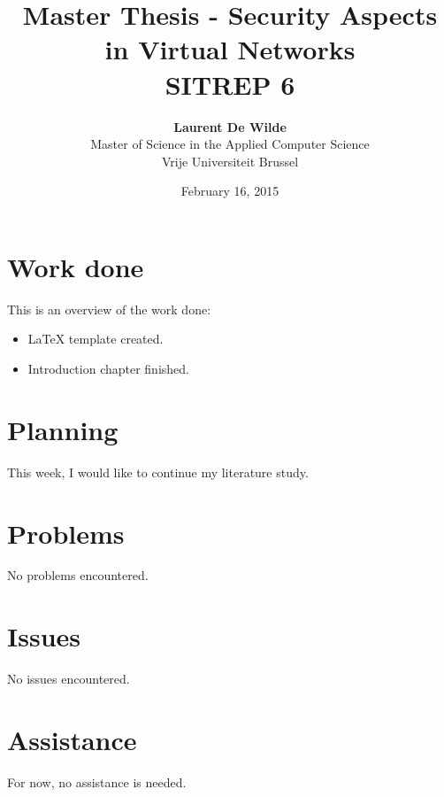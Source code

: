 \documentclass[11pt, a4paper]{article}
\title{Master Thesis -  Security Aspects in Virtual Networks\\ \textbf{SITREP 6}}
\author{\textbf{Laurent De Wilde} \\ Master of Science in the Applied Computer Science \\ Vrije Universiteit Brussel}
\date{February 16, 2015}
\begin{document}
\maketitle

\section{Work done}

This is an overview of the work done:
\begin{itemize}
\item LaTeX template created.
\item Introduction chapter finished.
\end{itemize}

\section{Planning}

This week, I would like to continue my literature study.

\section{Problems}

No problems encountered.

\section{Issues}

No issues encountered.

\section{Assistance}

For now, no assistance is needed.
\end{document}
